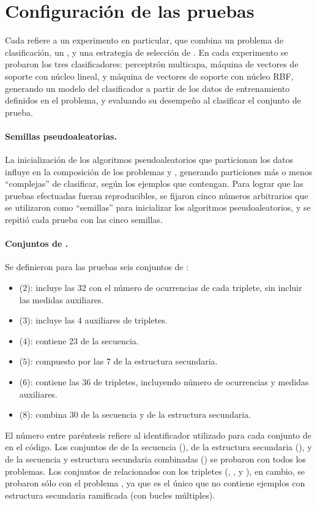 %
%
%
\section{Configuración de las pruebas}
%
Cada  refiere a un experimento en particular, que combina un
{problema} de clasificación, un , y una
estrategia de selección de .
En cada experimento se probaron los tres clasificadores: perceptrón
multicapa, máquina de vectores de soporte con núcleo lineal, y máquina
de vectores de soporte con núcleo RBF, generando un modelo del
clasificador a partir de los datos de entrenamiento definidos en el
problema, y evaluando su desempeño al clasificar el conjunto de
prueba.

\paragraph{Semillas pseudoaleatorias.}
La inicialización de los algoritmos pseudoaleatorios que particionan
los datos influye en la composición de los problemas \prob\mipred{} y
\prob\micropred{}, generando particiones más o menos ``complejas'' de
clasificar, según los ejemplos que contengan.
Para lograr que las pruebas efectuadas fueran reproducibles, se
fijaron cinco números arbitrarios que se utilizaron como ``semillas''
para inicializar los algoritmos pseudoaleatorios, y se repitió cada
prueba con las cinco semillas.

\paragraph{Conjuntos de .}
Se definieron para las pruebas seis conjuntos de :
%
\begin{itemize}
\item{} ($2$): incluye las $32$  con el número de
  ocurrencias de cada triplete, sin incluir las medidas auxiliares.
\item{} ($3$): incluye las $4$  auxiliares de
  tripletes.
\item{} ($4$): contiene $23$  de la secuencia.
\item{} ($5$): compuesto por las $7$  de la estructura
  secundaria.
\item{} ($6$): contiene las $36$  de tripletes,
  incluyendo número de ocurrencias y medidas auxiliares.
\item{} ($8$): combina $30$  de la secuencia y de la
  estructura secundaria.
\end{itemize}
%
El número entre paréntesis refiere al identificador utilizado para
cada conjunto de  en el código.
Los conjuntos de  de la secuencia (), de la
estructura secundaria (), y de la secuencia y estructura
secundaria combinadas () se probaron con todos los
problemas.
Los conjuntos de  relacionados con los tripletes (,
, y ), en cambio, se probaron sólo con el problema
\prob\tripletsvm{}, ya que es el único que no contiene ejemplos con
estructura secundaria ramificada (con bucles múltiples).

